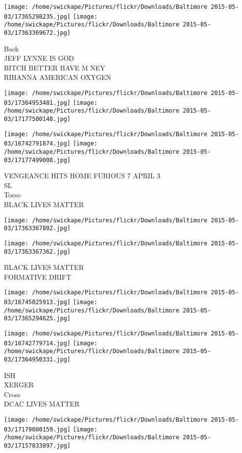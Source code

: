 \documentclass[10pt,letterpaper]{article}
\begin{document}
\texttt{[image: /home/swickape/Pictures/flickr/Downloads/Baltimore 2015-05-03/17365298235.jpg]}
\texttt{[image: /home/swickape/Pictures/flickr/Downloads/Baltimore 2015-05-03/17363369672.jpg]}

Back\\
JEFF LYNNE IS GOD\\
BITCH BETTER HAVE M NEY\\
RIHANNA AMERICAN OXYGEN
\pagebreak

\texttt{[image: /home/swickape/Pictures/flickr/Downloads/Baltimore 2015-05-03/17364953481.jpg]}
\texttt{[image: /home/swickape/Pictures/flickr/Downloads/Baltimore 2015-05-03/17177500148.jpg]}

\texttt{[image: /home/swickape/Pictures/flickr/Downloads/Baltimore 2015-05-03/16742791874.jpg]}
\texttt{[image: /home/swickape/Pictures/flickr/Downloads/Baltimore 2015-05-03/17177499008.jpg]}

VENGEANCE HITS HOME FURIOUS 7 APRIL 3\\
SL\\
Torso\\
BLACK LIVES MATTER
\pagebreak

\texttt{[image: /home/swickape/Pictures/flickr/Downloads/Baltimore 2015-05-03/17363367802.jpg]}

\vspace{0.25in}
\texttt{[image: /home/swickape/Pictures/flickr/Downloads/Baltimore 2015-05-03/17363367362.jpg]}

BLACK LIVES MATTER\\
FORMATIVE DRIFT
\pagebreak

\texttt{[image: /home/swickape/Pictures/flickr/Downloads/Baltimore 2015-05-03/16745025913.jpg]}
\texttt{[image: /home/swickape/Pictures/flickr/Downloads/Baltimore 2015-05-03/17365294625.jpg]}

\texttt{[image: /home/swickape/Pictures/flickr/Downloads/Baltimore 2015-05-03/16742779714.jpg]}
\texttt{[image: /home/swickape/Pictures/flickr/Downloads/Baltimore 2015-05-03/17364950331.jpg]}

ISH\\
XERGER\\
Cross\\
DCAC LIVES MATTER
\pagebreak

\texttt{[image: /home/swickape/Pictures/flickr/Downloads/Baltimore 2015-05-03/17179080159.jpg]}
\texttt{[image: /home/swickape/Pictures/flickr/Downloads/Baltimore 2015-05-03/17157833897.jpg]}
\end{document}
